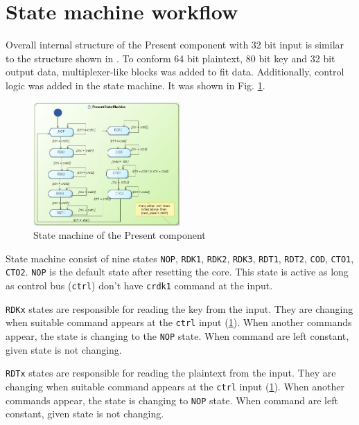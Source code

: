 \documentclass{gajewski}
\begin{document}
\newpage

\section{State machine workflow}

Overall internal structure of the Present component with 32 bit input is similar to the structure shown in \cite{PRESENT}. To conform 64 bit plaintext, 80 bit key and 32 bit output data, multiplexer-like blocks was added to fit data. Additionally, control logic was added in the state machine. It was shown in Fig. \ref{presentSM}.

\begin{figure}[!ht]%
    \begin{center}
    \includegraphics[width=0.5\textwidth]{img/SM.jpg}
    \caption{%
        State machine of the Present component
     }%
    \label{presentSM}
    \end{center}
 \end{figure}

State machine consist of nine states \texttt{NOP}, \texttt{RDK1}, \texttt{RDK2}, \texttt{RDK3}, \texttt{RDT1}, \texttt{RDT2}, \texttt{COD}, \texttt{CTO1}, \texttt{CTO2}. \texttt{NOP} is the default state after resetting the core. This state is active as long as control bus (\texttt{ctrl}) don't have \texttt{crdk1} command at the input.

\texttt{RDKx} states are responsible for reading the key from the input. They are changing when suitable command appears at the \texttt{ctrl} input (\ref{presentSM}). When another commands appear, the state is changing to the \texttt{NOP} state. When command are left constant, given state is not changing.

\texttt{RDTx} states are responsible for reading the plaintext from the input. They are changing when suitable command appears at the \texttt{ctrl} input (\ref{presentSM}). When another commands appear, the state is changing to \texttt{NOP} state. When command are left constant, given state is not changing.
\end{document}
